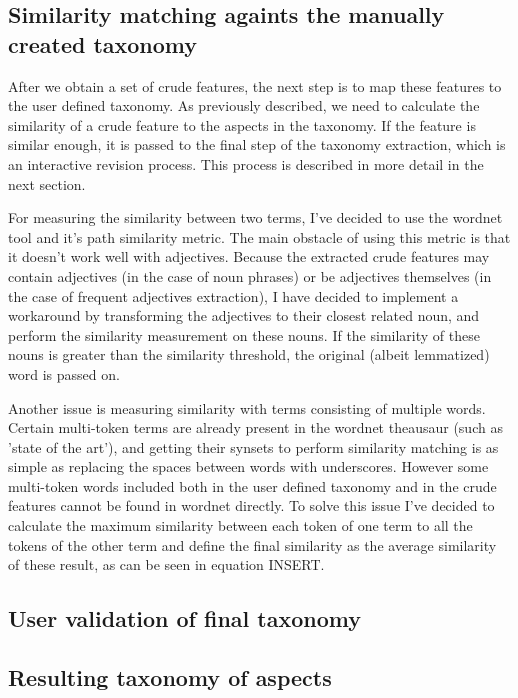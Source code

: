 \subsection{Similarity matching againts the manually created taxonomy}
After we obtain a set of crude features, the next step is to map these features to the user defined taxonomy. As previously described, we need to calculate the similarity of a crude feature to the aspects in the taxonomy. If the feature is similar enough, it is passed to the final step of the taxonomy extraction, which is an interactive revision process. This process is described in more detail in the next section.

For measuring the similarity between two terms, I've decided to use the wordnet tool and it's path similarity metric. The main obstacle of using this metric is that it doesn't work well with adjectives. Because the extracted crude features may contain adjectives (in the case of noun phrases) or be adjectives themselves (in the case of frequent adjectives extraction), I have decided to implement a workaround by transforming the adjectives to their closest related noun, and perform the similarity measurement on these nouns. If the similarity of these nouns is greater than the similarity threshold, the original (albeit lemmatized) word is passed on.

Another issue is measuring similarity with terms consisting of multiple words. Certain multi-token terms are already present in the wordnet theausaur (such as 'state of the art'), and getting their synsets to perform similarity matching is as simple as replacing the spaces between words with underscores. However some multi-token words included both in the user defined taxonomy and in the crude features cannot be found in wordnet directly. To solve this issue I've decided to calculate the maximum similarity between each token of one term to all the tokens of the other term and define the final similarity as the average similarity of these result, as can be seen in equation INSERT.

\subsection{User validation of final taxonomy}
\subsection{Resulting taxonomy of aspects}
